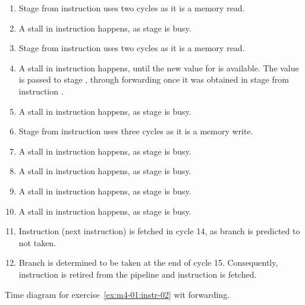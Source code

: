 \begin{enumerate}

\item Stage  from instruction 
      uses two cycles as it is a memory read.

\item A stall in instruction  happens,
      as stage  is busy. 

\item Stage  from instruction 
      uses two cycles as it is a memory read.

\item A stall in instruction  happens,
      until the new value for  is available.
      The value is passed to stage ,
      through forwarding once it was obtained in stage  
      from instruction .

\item A stall in instruction  happens,
      as stage  is busy. 

\item Stage  from instruction 
      uses three cycles as it is a memory write.

\item A stall in instruction  happens,
      as stage  is busy. 

\item A stall in instruction  happens,
      as stage  is busy. 

\item A stall in instruction  happens,
      as stage  is busy. 

\item A stall in instruction  happens,
      as stage  is busy. 

\item Instruction  (next instruction) is fetched
      in cycle 14, as branch is predicted to not taken.

\item Branch is determined to be taken at the end of cycle 15.
      Consequently, instruction  is retired from the pipeline
      and instruction  is fetched.

\end{enumerate}

\begin{table}[htb]

\caption{Time diagram for exercise~\ref{ex:m4-01:instr-02} wit forwarding.}
\label{ex:m4-01:instr-02:chrono:forward}
\end{table}

